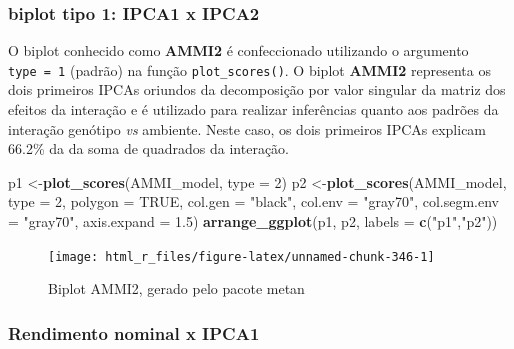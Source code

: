 \documentclass[
]{book}
\newenvironment{Shaded}{\begin{snugshade}}{\end{snugshade}}
\newcommand{\DataTypeTok}[1]{\textcolor[rgb]{0.13,0.29,0.53}{#1}}
\newcommand{\DecValTok}[1]{\textcolor[rgb]{0.00,0.00,0.81}{#1}}
\newcommand{\FloatTok}[1]{\textcolor[rgb]{0.00,0.00,0.81}{#1}}
\newcommand{\KeywordTok}[1]{\textcolor[rgb]{0.13,0.29,0.53}{\textbf{#1}}}
\newcommand{\NormalTok}[1]{#1}
\newcommand{\OtherTok}[1]{\textcolor[rgb]{0.56,0.35,0.01}{#1}}
\newcommand{\StringTok}[1]{\textcolor[rgb]{0.31,0.60,0.02}{#1}}
\begin{document}
\hypertarget{biplot-tipo-1-ipca1-x-ipca2}{%
\subsubsection{biplot tipo 1: IPCA1 x IPCA2}\label{biplot-tipo-1-ipca1-x-ipca2}}

O biplot conhecido como \textbf{AMMI2} é confeccionado utilizando o argumento \texttt{type\ =\ 1} (padrão) na função \texttt{plot\_scores()}. O biplot \textbf{AMMI2} representa os dois primeiros IPCAs oriundos da decomposição por valor singular da matriz dos efeitos da interação e é utilizado para realizar inferências quanto aos padrões da interação genótipo \emph{vs} ambiente. Neste caso, os dois primeiros IPCAs explicam 66.2\% da da soma de quadrados da interação.

\begin{Shaded}
\begin{Highlighting}[]

\NormalTok{p1 <-}\KeywordTok{plot_scores}\NormalTok{(AMMI_model, }\DataTypeTok{type =} \DecValTok{2}\NormalTok{)}
\NormalTok{p2 <-}\KeywordTok{plot_scores}\NormalTok{(AMMI_model,}
                 \DataTypeTok{type =} \DecValTok{2}\NormalTok{,}
                 \DataTypeTok{polygon =} \OtherTok{TRUE}\NormalTok{,}
                 \DataTypeTok{col.gen =} \StringTok{"black"}\NormalTok{,}
                 \DataTypeTok{col.env =} \StringTok{"gray70"}\NormalTok{,}
                 \DataTypeTok{col.segm.env =} \StringTok{"gray70"}\NormalTok{,}
                 \DataTypeTok{axis.expand =} \FloatTok{1.5}\NormalTok{)}
\KeywordTok{arrange_ggplot}\NormalTok{(p1, p2, }\DataTypeTok{labels =} \KeywordTok{c}\NormalTok{(}\StringTok{"p1"}\NormalTok{,}\StringTok{"p2"}\NormalTok{))}
\end{Highlighting}
\end{Shaded}

\begin{figure}

{\centering \texttt{[image: html\_r\_files/figure-latex/unnamed-chunk-346-1]} 

}

\caption{Biplot AMMI2, gerado pelo pacote metan}\label{fig:unnamed-chunk-346}
\end{figure}

\hypertarget{rendimento-nominal-x-ipca1}{%
\subsubsection{Rendimento nominal x IPCA1}\label{rendimento-nominal-x-ipca1}}
\end{document}
